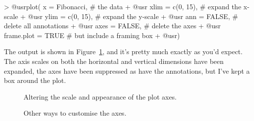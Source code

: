 \begin{rblock1}
> @usr{plot( x = Fibonacci, }      # the data
+ @usr{      xlim = c(0, 15),}     # expand the x-scale
+ @usr{      ylim = c(0, 15),}     # expand the y-scale
+ @usr{      ann = FALSE,}         # delete all annotations
+ @usr{      axes = FALSE,}        # delete the axes
+ @usr{      frame.plot = TRUE }   # but include a framing box
+ @usr{)}
\end{rblock1}
The output is shown in Figure~\ref{fig:fourthplot}, and it's pretty much exactly as you'd expect. The axis scales on both the horizontal and vertical dimensions have been expanded, the axes have been suppressed as have the annotations, but I've kept a box around the plot.

\begin{figure}[p]
\begin{center}
\caption{Altering the scale and appearance of the plot axes.}
\HR
\label{fig:fourthplot}
\end{center}
\end{figure}
\begin{figure}[p]
\begin{center}
\caption{Other ways to customise the axes.}
\HR
\label{fig:sixthplot}
\end{center}
\end{figure}

